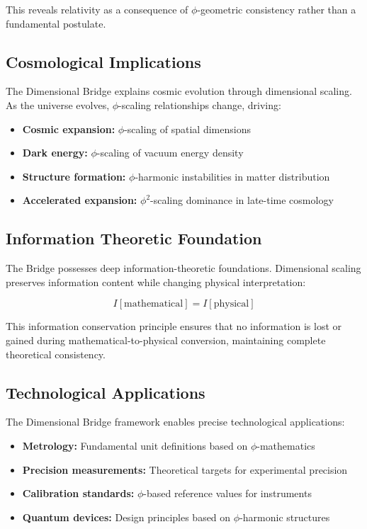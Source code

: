 This reveals relativity as a consequence of $\phi$-geometric consistency rather than a fundamental postulate.

\subsection{Cosmological Implications}

The Dimensional Bridge explains cosmic evolution through dimensional scaling. As the universe evolves, $\phi$-scaling relationships change, driving:

\begin{itemize}
\item \textbf{Cosmic expansion:} $\phi$-scaling of spatial dimensions
\item \textbf{Dark energy:} $\phi$-scaling of vacuum energy density
\item \textbf{Structure formation:} $\phi$-harmonic instabilities in matter distribution
\item \textbf{Accelerated expansion:} $\phi^2$-scaling dominance in late-time cosmology
\end{itemize}

\subsection{Information Theoretic Foundation}

The Bridge possesses deep information-theoretic foundations. Dimensional scaling preserves information content while changing physical interpretation:

\begin{equation}
I[\text{mathematical}] = I[\text{physical}]
\end{equation}

This information conservation principle ensures that no information is lost or gained during mathematical-to-physical conversion, maintaining complete theoretical consistency.

\subsection{Technological Applications}

The Dimensional Bridge framework enables precise technological applications:

\begin{itemize}
\item \textbf{Metrology:} Fundamental unit definitions based on $\phi$-mathematics
\item \textbf{Precision measurements:} Theoretical targets for experimental precision
\item \textbf{Calibration standards:} $\phi$-based reference values for instruments
\item \textbf{Quantum devices:} Design principles based on $\phi$-harmonic structures
\end{itemize}

